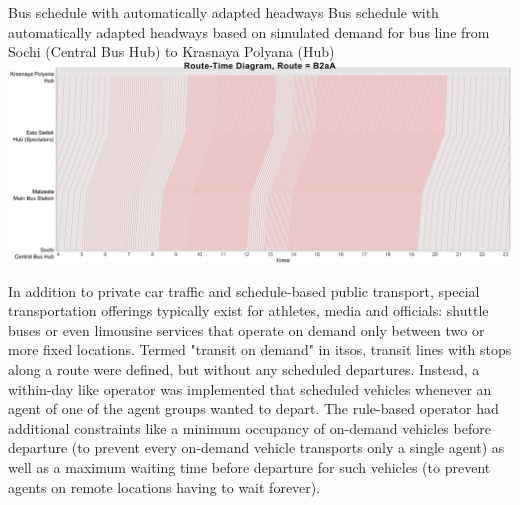 \createfigure%
{Bus schedule with automatically adapted headways}%
{Bus schedule with automatically adapted headways based on simulated demand for
bus line from Sochi (Central Bus Hub) to Krasnaya Polyana (Hub)}%
{\label{fig:sochi:adaptiveSchedule}}%
{\includegraphics[width=1.\textwidth,angle=0]{./using/figures/sochi_adaptiveSchedule.pdf}}%
{}

In addition to private car traffic and schedule-based public transport, special
transportation offerings typically exist for athletes, media and officials:
shuttle buses or even limousine services that operate on demand only between two
or more fixed locations. Termed "transit on demand" in \gls{itsos}, transit lines
with stops along a route were defined, but without any scheduled departures. 
Instead, a within-day like operator was implemented that scheduled vehicles
whenever an agent of one of the agent groups wanted to depart. The
rule-based operator had additional constraints like a minimum occupancy of
on-demand vehicles before departure (to prevent every on-demand vehicle
transports only a single agent) as well as a maximum waiting time before
departure for such vehicles (to prevent agents on remote locations having to
wait forever).

